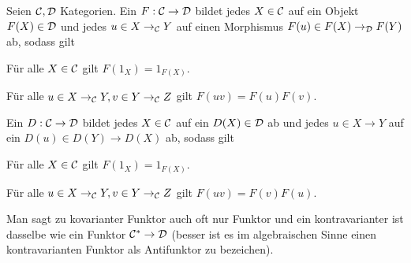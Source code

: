 \documentclass{book}
\begin{document}
\begin{definition}
    Seien $\mathcal{C}, \mathcal{D}$ Kategorien. Ein  $F:\mathcal{C}\rightarrow\mathcal{D}$ bildet jedes $X\in \mathcal{C}$ auf ein Objekt $F(X)\in\mathcal{D}$ und jedes $u\in X\rightarrow_{\mathcal{C}}Y$ auf einen Morphismus $F(u)\in F(X)\rightarrow_{\mathcal{D}} F(Y)$ ab, sodass gilt
    \begin{properties}
            \item Für alle $X\in\mathcal{C}$ gilt $F(1_X)=1_{F(X)}$.
            \item Für alle $u\in X\rightarrow_{\mathcal{C}} Y, v\in Y\rightarrow_{\mathcal{C}} Z$ gilt $F(uv)=F(u)F(v)$.
    \end{properties}
    Ein  $D:\mathcal{C}\rightarrow \mathcal{D}$ bildet jedes $X\in \mathcal{C}$ auf ein $D(X)\in \mathcal{D}$ ab und jedes $u\in X\to Y$ auf ein $D(u)\in D(Y)\to D(X)$ ab, sodass gilt
    \begin{properties}
            \item Für alle $X\in\mathcal{C}$ gilt $F(1_X)=1_{F(X)}$.
            \item Für alle $u\in X\rightarrow_{\mathcal{C}} Y, v\in Y\rightarrow_{\mathcal{C}} Z$ gilt $F(uv)=F(v)F(u)$.
    \end{properties}
\end{definition}

\begin{remark}
    Man sagt zu kovarianter Funktor auch oft nur Funktor und ein kontravarianter ist dasselbe wie ein Funktor $\mathcal{C}^{\ast}\rightarrow\mathcal{D}$ (besser ist es im algebraischen Sinne einen kontravarianten Funktor als Antifunktor zu bezeichen).
\end{remark}
\end{document}
